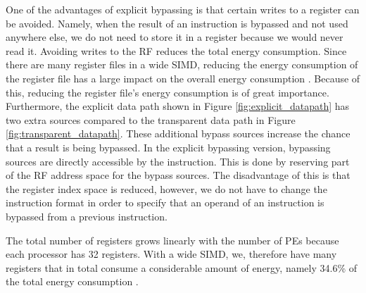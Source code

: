One of the advantages of explicit bypassing is that certain writes to a register can be avoided. Namely, when the result of an instruction is bypassed and not used anywhere else, we do not need to store it in a register because we would never read it. Avoiding writes to the RF reduces the total energy consumption. Since there are many register files in a wide SIMD, reducing the energy consumption of the register file has a large impact on the overall energy consumption \cite{dongrio1}. Because of this, reducing the register file's energy consumption is of great importance. Furthermore, the explicit data path shown in Figure \ref{fig:explicit_datapath} has two extra sources compared to the transparent data path in Figure \ref{fig:transparent_datapath}. These additional bypass sources increase the chance that a result is being bypassed. In the explicit bypassing version, bypassing sources are directly accessible by the instruction. This is done by reserving part of the RF address space for the bypass sources. The disadvantage of this is that the register index space is reduced, however, we do not have to change the instruction format in order to specify that an operand of an instruction is bypassed from a previous instruction.

The total number of registers grows linearly with the number of PEs because each processor has 32 registers. With a wide SIMD, we, therefore have many registers that in total consume a considerable amount of energy, namely 34.6\% of the total energy consumption \cite{dongrio1}.






